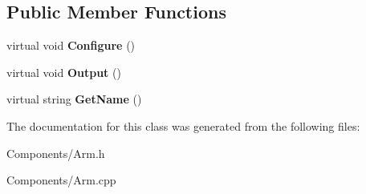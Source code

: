 \subsection*{\-Public \-Member \-Functions}
\begin{DoxyCompactItemize}
\item 
\hypertarget{class_arm_a0b3a6287310f344c35af067509aad924}{
virtual void {\bfseries \-Configure} ()}
\label{class_arm_a0b3a6287310f344c35af067509aad924}

\item 
\hypertarget{class_arm_a7cbf8526410f9de7f3f6bc4303c426f4}{
virtual void {\bfseries \-Output} ()}
\label{class_arm_a7cbf8526410f9de7f3f6bc4303c426f4}

\item 
\hypertarget{class_arm_ae3c8d209d62c53edd4d99f85a85dd0f9}{
virtual string {\bfseries \-Get\-Name} ()}
\label{class_arm_ae3c8d209d62c53edd4d99f85a85dd0f9}

\end{DoxyCompactItemize}


\-The documentation for this class was generated from the following files\-:\begin{DoxyCompactItemize}
\item 
\-Components/\-Arm.\-h\item 
\-Components/\-Arm.\-cpp\end{DoxyCompactItemize}
